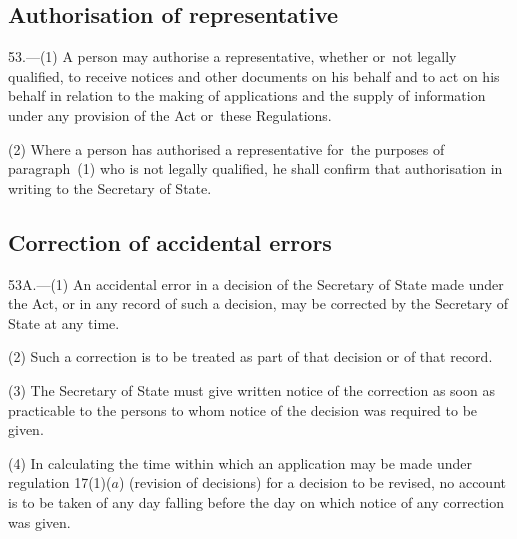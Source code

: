 \documentclass[a4paper,12pt]{article}
\begin{document}
\subsection[53. Authorisation of representative]{Authorisation of representative}

53.—(1) A person may authorise a representative, whether or~not legally qualified, to receive notices and other documents on his behalf and to act on his behalf in relation to the making of applications and the supply of information under any provision of the Act or~these Regulations.

(2) Where a person has authorised a representative for~the purposes of paragraph~(1) who is not legally qualified, he shall confirm that authorisation in writing to the Secretary of State.

\subsection[53A. Correction of accidental errors]{Correction of accidental errors}

53A.—(1) An accidental error in a decision of the Secretary of State made under the Act, or in any record of such a decision, may be corrected by the Secretary of State at any time.

(2) Such a correction is to be treated as part of that decision or of that record.

(3) The Secretary of State must give written notice of the correction as soon as practicable to the persons to whom notice of the decision was required to be given.

(4) In calculating the time within which an application may be made under regulation 17(1)($a$)  (revision of decisions) for a decision to be revised, no account is to be taken of any day falling before the day on which notice of any correction was given.

\end{document}
